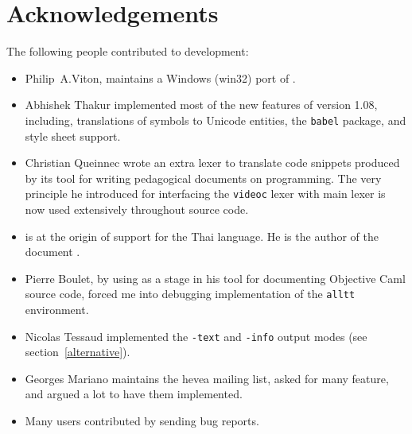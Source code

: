 \section{Acknowledgements}
The following people contributed to \hevea{} development:
\begin{itemize}
\item Philip~A.Viton, maintains a
{Windows (win32) port} of \hevea.
\item Abhishek Thakur implemented most of the new features of version
1.08, including, translations of symbols to Unicode entities,
the  \texttt{babel} package, and style sheet support.
\item Christian Queinnec wrote an extra lexer to translate code
snippets produced by its tool
for writing pedagogical documents on programming.
The very principle he introduced for interfacing the \texttt{videoc}
lexer with \hevea{} main lexer is now used extensively throughout
\hevea{} source code.
\item {}
is at the origin of support for the Thai language. He is
the author of the document .
\item Pierre Boulet, by using \hevea{} as a stage in his tool
for documenting Objective Caml source code, forced me into debugging
\hevea{} implementation of the \verb+alltt+ environment.
\item Nicolas Tessaud implemented the \verb+-text+ and \verb+-info+
output modes (see section~\ref{alternative}).
\item Georges Mariano maintains the hevea mailing list, asked for
many feature, and argued a lot to have them implemented.
\item Many users contributed by sending bug reports.
\end{itemize}

